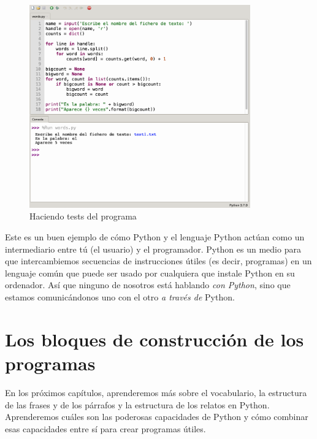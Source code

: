 \begin{figure}[t]
    \centering
    \includegraphics[width=0.85\textwidth]{images/Thonny-execute-words.png}
    \caption{Haciendo tests del programa}
    \label{fig:Thonny-execute-words}
\end{figure}



Este es un buen ejemplo de cómo Python y el lenguaje Python actúan como
un intermediario entre tú (el usuario) y el programador.
Python es un medio para que intercambiemos secuencias de instrucciones útiles (es decir, programas) en un lenguaje común que puede ser usado por cualquiera que instale Python en su ordenador. Así que ninguno de nosotros está hablando \emph{con Python}, sino que estamos comunicándonos uno con el otro \emph{a través de} Python.






\hypertarget{los-bloques-de-construccion-de-los-programas}{%
\section{Los bloques de construcción de los
programas}\label{los-bloques-de-construccion-de-los-programas}}

En los próximos capítulos, aprenderemos más sobre el vocabulario, la
estructura de las frases y de los párrafos y la estructura de los
relatos en Python. Aprenderemos cuáles son las poderosas capacidades de
Python y cómo combinar esas capacidades entre sí para crear programas
útiles.

